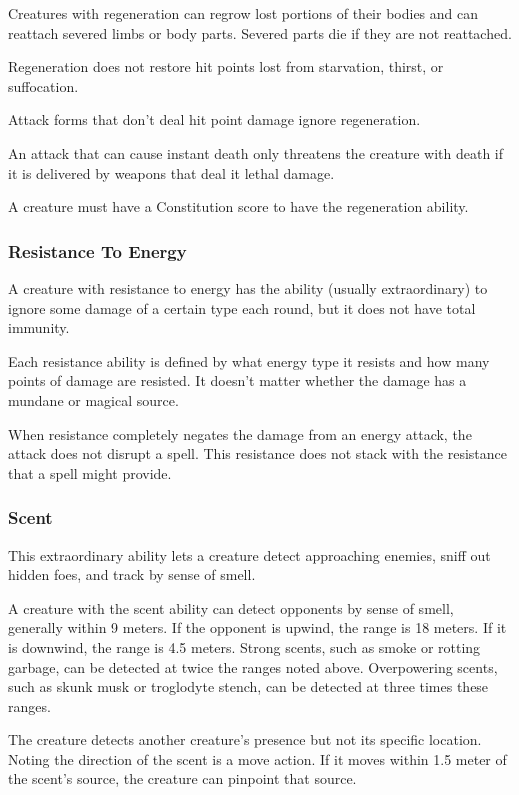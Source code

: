 Creatures with regeneration can regrow lost portions of their bodies and can reattach severed limbs or body parts. Severed parts die if they are not reattached.

Regeneration does not restore hit points lost from starvation, thirst, or suffocation.

Attack forms that don't deal hit point damage ignore regeneration.

An attack that can cause instant death only threatens the creature with death if it is delivered by weapons that deal it lethal damage.

A creature must have a Constitution score to have the regeneration ability.

\subsubsection{Resistance To Energy}
A creature with resistance to energy has the ability (usually extraordinary) to ignore some damage of a certain type each round, but it does not have total immunity.

Each resistance ability is defined by what energy type it resists and how many points of damage are resisted. It doesn't matter whether the damage has a mundane or magical source.

When resistance completely negates the damage from an energy attack, the attack does not disrupt a spell. This resistance does not stack with the resistance that a spell might provide.

\subsubsection{Scent}
This extraordinary ability lets a creature detect approaching enemies, sniff out hidden foes, and track by sense of smell.

A creature with the scent ability can detect opponents by sense of smell, generally within 9 meters. If the opponent is upwind, the range is 18 meters. If it is downwind, the range is 4.5 meters. Strong scents, such as smoke or rotting garbage, can be detected at twice the ranges noted above. Overpowering scents, such as skunk musk or troglodyte stench, can be detected at three times these ranges.

The creature detects another creature's presence but not its specific location. Noting the direction of the scent is a move action. If it moves within 1.5 meter of the scent's source, the creature can pinpoint that source.

